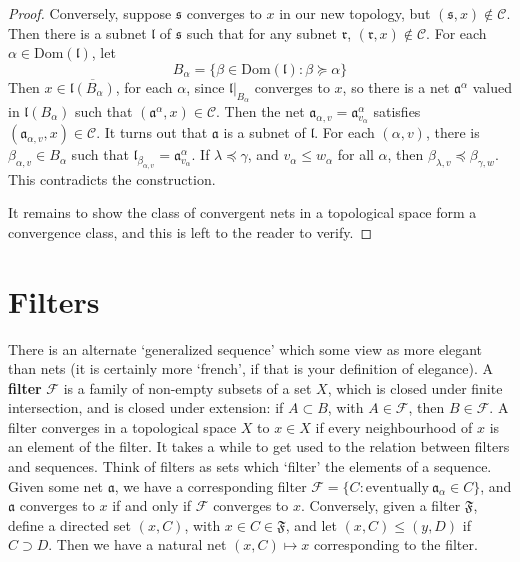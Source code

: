 \begin{proof}
    Conversely, suppose $\mathfrak{s}$ converges to $x$ in our new topology, but $(\mathfrak{s},x) \not \in \mathcal{C}$. Then there is a subnet $\mathfrak{l}$ of $\mathfrak{s}$ such that for any subnet $\mathfrak{r}$, $(\mathfrak{r}, x) \not \in \mathcal{C}$. For each $\alpha \in \text{Dom}(\mathfrak{l})$, let
    \[ B_\alpha = \{ \beta \in \text{Dom}(\mathfrak{l}) : \beta \succeq \alpha \} \]
    Then $x \in \overline{\mathfrak{l}(B_\alpha)}$, for each $\alpha$, since $\mathfrak{l}|_{B_\alpha}$ converges to $x$, so there is a net $\mathfrak{a}^\alpha$ valued in $\mathfrak{l}(B_\alpha)$ such that $(\mathfrak{a}^\alpha, x) \in \mathcal{C}$. Then the net $\mathfrak{a}_{\alpha, v} = \mathfrak{a}^\alpha_{v_\alpha}$ satisfies $(\mathfrak{a}_{\alpha, v}, x) \in \mathcal{C}$. It turns out that $\mathfrak{a}$ is a subnet of $\mathfrak{l}$. For each $(\alpha, v)$, there is $\beta_{\alpha,v} \in B_\alpha$ such that $\mathfrak{l}_{\beta_{\alpha,v}} = \mathfrak{a}^\alpha_{v_\alpha}$. If $\lambda \preceq \gamma$, and $v_\alpha \leq w_\alpha$ for all $\alpha$, then $\beta_{\lambda,v} \preceq \beta_{\gamma,w}$. This contradicts the construction.

    It remains to show the class of convergent nets in a topological space form a convergence class, and this is left to the reader to verify.
\end{proof}

\section{Filters}

There is an alternate `generalized sequence' which some view as more elegant than nets (it is certainly more `french', if that is your definition of elegance). A {\bf filter} $\mathcal{F}$ is a family of non-empty subsets of a set $X$, which is closed under finite intersection, and is closed under extension: if $A \subset B$, with $A \in \mathcal{F}$, then $B \in \mathcal{F}$. A filter converges in a topological space $X$ to $x \in X$ if every neighbourhood of $x$ is an element of the filter. It takes a while to get used to the relation between filters and sequences. Think of filters as sets which `filter' the elements of a sequence. Given some net $\mathfrak{a}$, we have a corresponding filter $\mathcal{F} = \{ C : \text{eventually}\ \mathfrak{a}_\alpha \in C \}$, and $\mathfrak{a}$ converges to $x$ if and only if $\mathcal{F}$ converges to $x$. Conversely, given a filter $\mathfrak{F}$, define a directed set $(x,C)$, with $x \in C \in \mathfrak{F}$, and let $(x,C) \leq (y,D)$ if $C \supset D$. Then we have a natural net $(x,C) \mapsto x$ corresponding to the filter.


